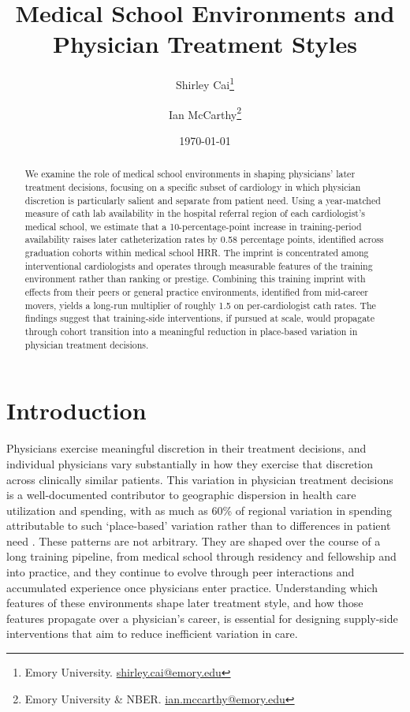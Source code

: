 \documentclass[12pt]{article}
\title{Medical School Environments and Physician Treatment Styles}
\author{Shirley Cai\thanks{Emory University. \href{mailto:shirley.cai@emory.edu}{shirley.cai@emory.edu}} \and Ian McCarthy\thanks{Emory University \& NBER.
\href{mailto:ian.mccarthy@emory.edu}{ian.mccarthy@emory.edu}}}
\date{\today}
\begin{document}
\maketitle

\begin{abstract}
\noindent We examine the role of medical school environments in shaping physicians' later treatment decisions, focusing on a specific subset of cardiology in which physician discretion is particularly salient and separate from patient need. Using a year-matched measure of cath lab availability in the hospital referral region of each cardiologist's medical school, we estimate that a 10-percentage-point increase in training-period availability raises later catheterization rates by 0.58 percentage points, identified across graduation cohorts within medical school HRR. The imprint is concentrated among interventional cardiologists and operates through measurable features of the training environment rather than ranking or prestige. Combining this training imprint with effects from their peers or general practice environments, identified from mid-career movers, yields a long-run multiplier of roughly 1.5 on per-cardiologist cath rates. The findings suggest that training-side interventions, if pursued at scale, would propagate through cohort transition into a meaningful reduction in place-based variation in physician treatment decisions.
\end{abstract}

\clearpage

\section{Introduction}\label{sec:intro}

Physicians exercise meaningful discretion in their treatment decisions, and individual physicians vary substantially in how they exercise that discretion across clinically similar patients. This variation in physician treatment decisions is a well-documented contributor to geographic dispersion in health care utilization and spending, with as much as 60\% of regional variation in spending attributable to such `place-based' variation rather than to differences in patient need \citep{finkelstein2016, molitor2018, cutler2019, badinski2023}. These patterns are not arbitrary. They are shaped over the course of a long training pipeline, from medical school through residency and fellowship and into practice, and they continue to evolve through peer interactions and accumulated experience once physicians enter practice. Understanding which features of these environments shape later treatment style, and how those features propagate over a physician's career, is essential for designing supply-side interventions that aim to reduce inefficient variation in care.
\end{document}
